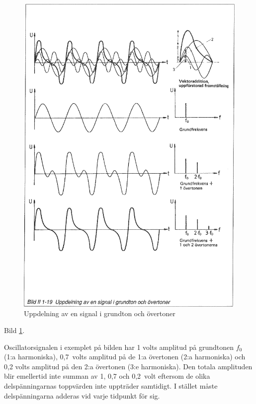 \begin{figure}
\begin{center}
\includegraphics[width=\textwidth]{images/bild_2_1-19}
\caption{Uppdelning av en signal i grundton och övertoner}
\label{fig:BildII1-19}
\end{center}
\end{figure}

Bild \ref{fig:BildII1-19}.

Oscillatorsignalen i exemplet på bilden har 1 volts amplitud på grundtonen
\(f_0\) (1:a harmoniska), 0,7~volts amplitud på de 1:a övertonen
(2:a harmoniska) och 0,2 volts amplitud på den 2:a övertonen (3:e harmoniska).
Den totala amplituden blir emellertid inte summan av 1, 0,7 och 0,2~volt
eftersom de olika delspänningarnas toppvärden inte uppträder samtidigt.
I stället måste delspänningarna adderas vid varje tidpunkt för sig.

